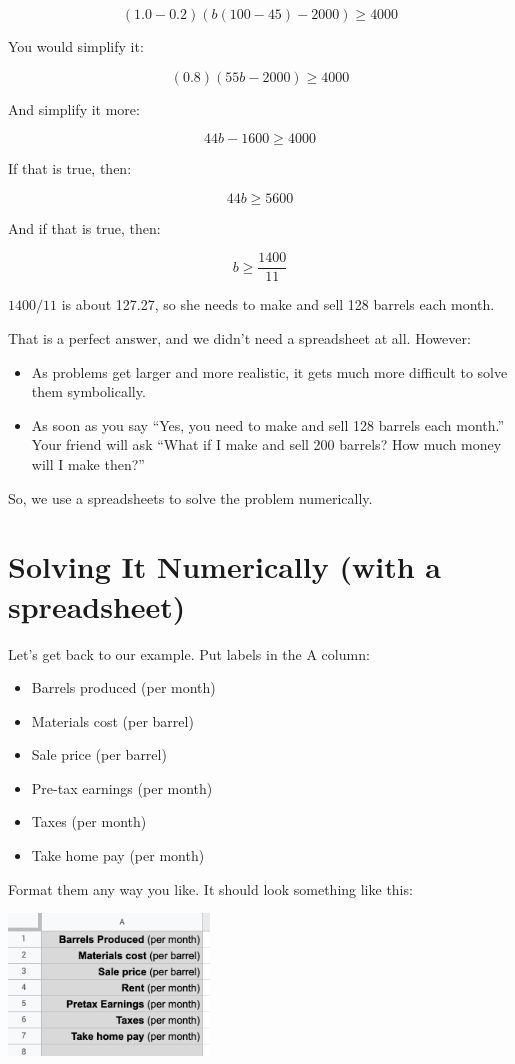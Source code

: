 $$(1.0 - 0.2)\left(b(100 - 45) - 2000\right) \geq 4000$$

You would simplify it:

$$(0.8)\left(55 b - 2000\right) \geq 4000$$

And simplify it more:

$$44b - 1600 \geq 4000$$

If that is true, then:

$$44b \geq 5600$$

And if that is true, then:

$$b \geq \frac{1400}{11}$$

$1400/11$ is about 127.27, so she needs to make and sell 128 barrels
each month.

That is a perfect answer, and we didn't need a spreadsheet at all. However:
\begin{itemize}
\item As problems get larger and more realistic, it gets much more difficult to solve them symbolically.
\item As soon as you say ``Yes, you need to make and sell 128 barrels
  each month.'' Your friend will ask ``What if I make and sell 200
  barrels? How much money will I make then?''
\end{itemize}

So, we use a spreadsheets to solve the problem numerically.

\section{Solving It Numerically (with a spreadsheet)}


Let's get back to our example. Put labels in the A column:
\begin{itemize}
\item{Barrels produced (per month)}
\item{Materials cost (per barrel)}
\item{Sale price (per barrel)}
\item{Pre-tax earnings (per month)}
\item{Taxes (per month)}
\item{Take home pay (per month)}
\end{itemize}

Format them any way you like. It should look something like this:

\includegraphics[width=0.4\textwidth]{BarrelLabels.png}

